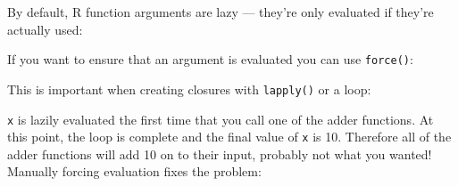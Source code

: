 By default, R function arguments are lazy --- they're only evaluated if
they're actually used: 

\begin{Shaded}
\begin{Highlighting}[]
\StringTok{ }
\NormalTok{\}}
\NormalTok{(}\NormalTok{(}\NormalTok{))}
\end{Highlighting}
\end{Shaded}

If you want to ensure that an argument is evaluated you can use
\texttt{force()}: 

\begin{Shaded}
\begin{Highlighting}[]
\StringTok{ }
\NormalTok{\}}
\NormalTok{(}\NormalTok{(}\NormalTok{))}
\end{Highlighting}
\end{Shaded}

This is important when creating closures with \texttt{lapply()} or a
loop:

\begin{Shaded}
\begin{Highlighting}[]
\StringTok{ }
  \StringTok{ }
\NormalTok{\}}
\StringTok{ }\NormalTok{(}\NormalTok{:}
\NormalTok{adders[[}\NormalTok{]](}\NormalTok{)}
\NormalTok{adders[[}\NormalTok{]](}\NormalTok{)}
\end{Highlighting}
\end{Shaded}

\texttt{x} is lazily evaluated the first time that you call one of the
adder functions. At this point, the loop is complete and the final value
of \texttt{x} is 10. Therefore all of the adder functions will add 10 on
to their input, probably not what you wanted! Manually forcing
evaluation fixes the problem:

\begin{Shaded}
\begin{Highlighting}[]
\StringTok{ }
  \StringTok{ }
\NormalTok{\}}
\StringTok{ }\NormalTok{(}\NormalTok{:}
\NormalTok{adders2[[}\NormalTok{]](}\NormalTok{)}
\NormalTok{adders2[[}\NormalTok{]](}\NormalTok{)}
\end{Highlighting}
\end{Shaded}

